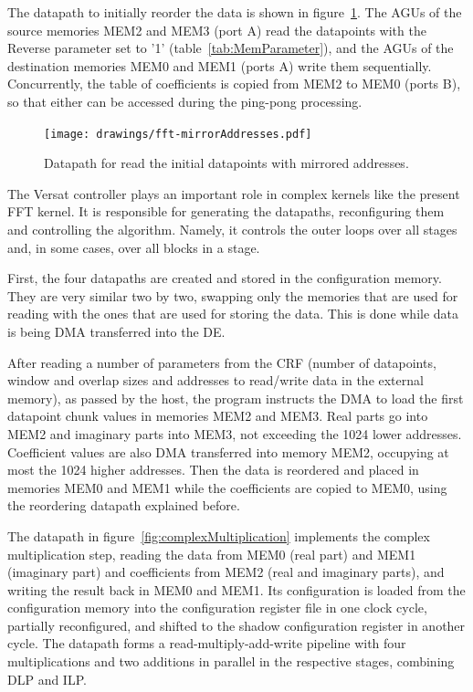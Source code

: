The datapath to initially reorder the data is shown in
figure~\ref{fig:mirrorAddresses}. The AGUs of the source memories MEM2
and MEM3 (port A) read the datapoints with the Reverse parameter set
to '1' (table~\ref{tab:MemParameter}), and the AGUs of the destination
memories MEM0 and MEM1 (ports A) write them
sequentially. Concurrently, the table of coefficients is copied from
MEM2 to MEM0 (ports B), so that either can be accessed during the
ping-pong processing.

\begin{figure}[!htb]
\centering
\texttt{[image: drawings/fft-mirrorAddresses.pdf]}
\caption{Datapath for read the initial datapoints with mirrored
  addresses.}
\label{fig:mirrorAddresses}
\end{figure}

The Versat controller plays an important role in complex kernels like
the present FFT kernel. It is responsible for generating the
datapaths, reconfiguring them and controlling the algorithm. Namely,
it controls the outer loops over all stages and, in some cases, over
all blocks in a stage.

First, the four datapaths are created and stored in the configuration
memory. They are very similar two by two, swapping only the memories
that are used for reading with the ones that are used for storing the
data. This is done while data is being DMA transferred into the DE.

After reading a number of parameters from the CRF (number of
datapoints, window and overlap sizes and addresses to read/write data
in the external memory), as passed by the host, the program instructs
the DMA to load the first datapoint chunk values in memories MEM2 and
MEM3. Real parts go into MEM2 and imaginary parts into MEM3, not
exceeding the 1024 lower addresses. Coefficient values are also DMA
transferred into memory MEM2, occupying at most the 1024 higher
addresses. Then the data is reordered and placed in memories MEM0 and
MEM1 while the coefficients are copied to MEM0, using the reordering
datapath explained before.

The datapath in figure~\ref{fig:complexMultiplication} implements the
complex multiplication step, reading the data from MEM0 (real part)
and MEM1 (imaginary part) and coefficients from MEM2 (real and
imaginary parts), and writing the result back in MEM0 and MEM1. Its
configuration is loaded from the configuration memory into the
configuration register file in one clock cycle, partially
reconfigured, and shifted to the shadow configuration register in
another cycle. The datapath forms a read-multiply-add-write pipeline
with four multiplications and two additions in parallel in the
respective stages, combining DLP and ILP.

